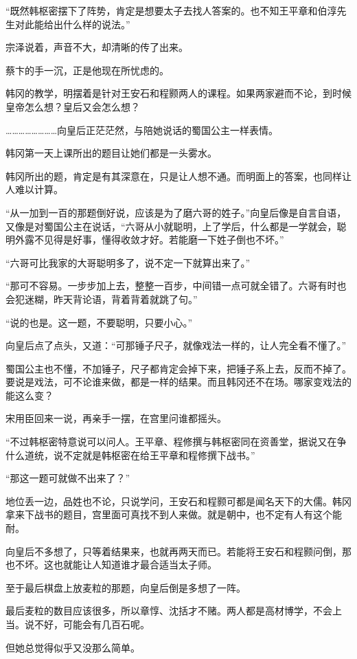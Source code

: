 “既然韩枢密摆下了阵势，肯定是想要太子去找人答案的。也不知王平章和伯淳先生对此能给出什么样的说法。”

宗泽说着，声音不大，却清晰的传了出来。

蔡卞的手一沉，正是他现在所忧虑的。

韩冈的教学，明摆着是针对王安石和程颢两人的课程。如果两家避而不论，到时候皇帝怎么想？皇后又会怎么想？

……………………向皇后正茫茫然，与陪她说话的蜀国公主一样表情。

韩冈第一天上课所出的题目让她们都是一头雾水。

韩冈所出的题，肯定是有其深意在，只是让人想不通。而明面上的答案，也同样让人难以计算。

“从一加到一百的那题倒好说，应该是为了磨六哥的姓子。”向皇后像是自言自语，又像是对蜀国公主在说话，“六哥从小就聪明，上了学后，什么都是一学就会，聪明外露不见得是好事，懂得收敛才好。若能磨一下姓子倒也不坏。”

“六哥可比我家的大哥聪明多了，说不定一下就算出来了。”

“那可不容易。一步步加上去，整整一百步，中间错一点可就全错了。六哥有时也会犯迷糊，昨天背论语，背着背着就跳了句。”

“说的也是。这一题，不要聪明，只要小心。”

向皇后点了点头，又道：“可那锤子尺子，就像戏法一样的，让人完全看不懂了。”

蜀国公主也不懂，不加锤子，尺子都肯定会掉下来，把锤子系上去，反而不掉了。要说是戏法，可不论谁来做，都是一样的结果。而且韩冈还不在场。哪家变戏法的能这么变？

宋用臣回来一说，再亲手一摆，在宫里问谁都摇头。

“不过韩枢密特意说可以问人。王平章、程修撰与韩枢密同在资善堂，据说又在争什么道统，说不定就是韩枢密在给王平章和程修撰下战书。”

“那这一题可就做不出来了？”

地位丢一边，品姓也不论，只说学问，王安石和程颢可都是闻名天下的大儒。韩冈拿来下战书的题目，宫里面可真找不到人来做。就是朝中，也不定有人有这个能耐。

向皇后不多想了，只等着结果来，也就再两天而已。若能将王安石和程颢问倒，那也不坏。这也就能让人知道谁才最合适当太子师。

至于最后棋盘上放麦粒的那题，向皇后倒是多想了一阵。

最后麦粒的数目应该很多，所以章惇、沈括才不赌。两人都是高材博学，不会上当。说不好，可能会有几百石呢。

但她总觉得似乎又没那么简单。

